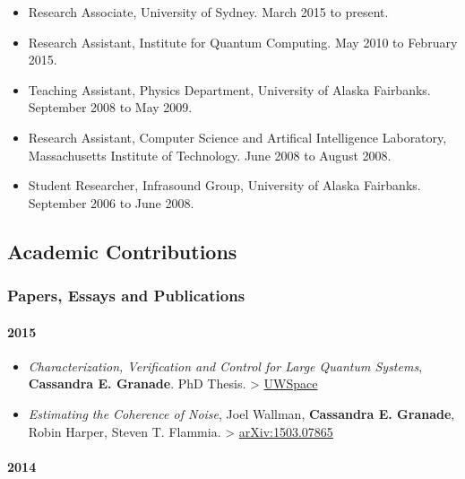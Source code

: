 \documentclass[]{article}
\begin{document}
\begin{itemize}
\itemsep1pt\parskip0pt
\item
  Research Associate, University of Sydney. March 2015 to present.
\item
  Research Assistant, Institute for Quantum Computing. May 2010 to
  February 2015.
\item
  Teaching Assistant, Physics Department, University of Alaska
  Fairbanks. September 2008 to May 2009.
\item
  Research Assistant, Computer Science and Artifical Intelligence
  Laboratory, Massachusetts Institute of Technology. June 2008 to August
  2008.
\item
  Student Researcher, Infrasound Group, University of Alaska Fairbanks.
  September 2006 to June 2008.
\end{itemize}

\subsection{Academic Contributions}\label{academic-contributions}

\subsubsection{Papers, Essays and
Publications}\label{papers-essays-and-publications}

\paragraph{2015}\label{section}

\begin{itemize}
\item
  \emph{Characterization, Veriﬁcation and Control for Large Quantum
  Systems}, \textbf{Cassandra E. Granade}. PhD Thesis. \textgreater{}
  \href{https://uwspace.uwaterloo.ca/handle/10012/9217}{UWSpace}
\item
  \emph{Estimating the Coherence of Noise}, Joel Wallman,
  \textbf{Cassandra E. Granade}, Robin Harper, Steven T. Flammia.
  \textgreater{}
  \href{https://scirate.com/arxiv/1503.07865}{arXiv:1503.07865}
\end{itemize}

\paragraph{2014}\label{section-1}
\end{document}
